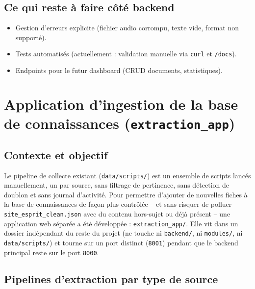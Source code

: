 \documentclass[11pt,a4paper]{report}
\begin{document}
\section{Ce qui reste à faire côté backend}
\begin{itemize}
    \item Gestion d'erreurs explicite (fichier audio corrompu, texte vide, format non
    supporté).
    \item Tests automatisés (actuellement : validation manuelle via \texttt{curl} et
    \texttt{/docs}).
    \item Endpoints pour le futur dashboard (CRUD documents, statistiques).
\end{itemize}

\chapter{Application d'ingestion de la base de connaissances (\texttt{extraction\_app})}

\section{Contexte et objectif}

Le pipeline de collecte existant (\texttt{data/scripts/}) est un ensemble de scripts
lancés manuellement, un par source, sans filtrage de pertinence, sans détection de
doublon et sans journal d'activité. Pour permettre d'ajouter de nouvelles fiches à la
base de connaissances de façon plus contrôlée -- et sans risquer de polluer
\texttt{site\_esprit\_clean.json} avec du contenu hors-sujet ou déjà présent -- une
application web séparée a été développée : \texttt{extraction\_app/}. Elle vit dans un
dossier indépendant du reste du projet (ne touche ni \texttt{backend/}, ni
\texttt{modules/}, ni \texttt{data/scripts/}) et tourne sur un port distinct
(\texttt{8001}) pendant que le backend principal reste sur le port \texttt{8000}.

\section{Pipelines d'extraction par type de source}
\end{document}
